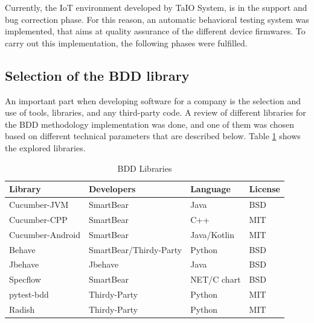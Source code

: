 \documentclass[journal]{IEEEtran}	%
\begin{document}
Currently, the IoT environment developed by TaIO System, is in the support and bug correction phase. For this reason, an automatic behavioral testing system was implemented, that aims at quality assurance of the different device firmwares. To carry out this implementation, the following phases were fulfilled.


\subsection{Selection of the BDD library}


An important part when developing software for a company is the selection and use of tools, libraries, and any third-party code. A review of different libraries for the BDD methodology implementation was done, and one of them was chosen based on different technical parameters that are described below. Table \ref{tab:libraries} shows the explored libraries.

\begin{table}[h!t!]
\renewcommand{\arraystretch}{1.25}		%
\centering
\caption{BDD Libraries}	%
\label{tab:libraries}
\begin{tabular}{l|l|l|l}					%
\hline \hline
\textbf{Library}        				&   \textbf{Developers}     &	\textbf{Language}	&	\textbf{License}			\\
\hline
Cucumber-JVM        &   SmartBear	            &	Java            &   BSD\\
Cucumber-CPP        &   SmartBear	            &	C++             &   MIT\\
Cucumber-Android    &   SmartBear	            &	Java/Kotlin     &   MIT\\
Behave              &   SmartBear/Thirdy-Party	&	Python          &   BSD\\
Jbehave             &   Jbehave	                &	Java            &   BSD\\
Specflow            &   SmartBear	            &	NET/C chart     &   BSD\\
pytest-bdd          &   Thirdy-Party	        &	Python          &   MIT\\
Radish              &   Thirdy-Party	        &	Python          &   MIT\\
\hline \hline
\end{tabular}
\end{table}
\end{document}

